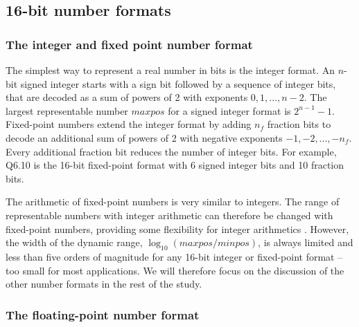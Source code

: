 \documentclass[draft]{agujournal2019}
\begin{document}
\subsection{16-bit number formats}

\subsubsection{The integer and fixed point number format}
\label{sec:integer}

The simplest way to represent a real number in bits is the integer format.
An $n$-bit signed integer starts with a sign bit followed by a sequence of integer
bits, that are decoded as a sum of powers of 2 with exponents $0,1,...,n-2$.
The largest representable number $maxpos$ for a signed integer format is $2^{n-1}-1$.
Fixed-point numbers extend the integer format by adding $n_f$ fraction bits to
decode an additional sum of powers of 2 with negative exponents $-1,-2,...,-n_f$.
Every additional fraction bit reduces the number of integer bits. For example,
Q6.10 is the 16-bit fixed-point format with 6 signed integer bits and 10 fraction bits.

The arithmetic of fixed-point numbers is very similar to integers. The range of
representable numbers with integer arithmetic can therefore be
changed with fixed-point numbers, providing some flexibility for integer arithmetics
\cite{Russell2017}. However, the width of the dynamic range, $\log_{10}(maxpos/minpos)$,
is always limited and less than five orders of magnitude for any 16-bit integer
or fixed-point format -- too small for most applications. We will therefore focus
on the discussion of the other number formats in the rest of the study.

\subsubsection{The floating-point number format}
\label{sec:floats}
\end{document}

